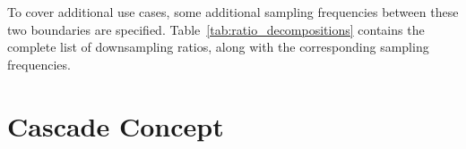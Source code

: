 To cover  additional use cases,  some additional sampling  frequencies between
these   two  boundaries   are  specified. Table~\ref{tab:ratio_decompositions}
contains  the   complete  list   of  downsampling   ratios,  along   with  the
corresponding sampling frequencies.

\begin{table}
    \centering
    \caption[Downsampling Ratios, Decompositions, and Target Frequencies]{
        The  chosen downsampling  ratios, their  prime factor  decompositions,
        the  downsampling ratios  distribet across  stages, and  the resultant
        sampling rates%
    }
    \label{tab:ratio_decompositions}
\end{table}




\section{Cascade Concept} %
\label{sec:cascade_concept}

